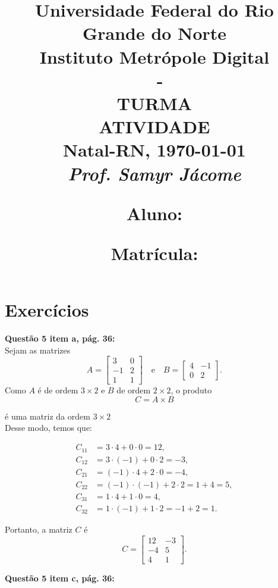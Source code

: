 \documentclass[a4paper,12pt]{article}
\author{}
\date{}
\title{
\vspace{-2cm}
\Large \textbf{Universidade Federal do Rio Grande do Norte}\\ 
Instituto Metrópole Digital \\ 
\coddisciplina $\;$ - \nomedisciplina \\ 
TURMA \codturma \\
\vspace{5mm} \Large\textbf{ATIVIDADE \codatividade} \\
\normalsize Natal-RN, \today\\
\vspace{0.7cm} \large \textit{Prof. Samyr Jácome}\\

\justifying
\vspace{0.5cm} \hspace{-0.82cm}
\begin{minipage}{.6\linewidth}
    \large \textbf{Aluno:} \nomedoaluno
\end{minipage}
\begin{minipage}{.4\linewidth}
    \begin{flushright}
        \large \textbf{Matrícula:} \matricula
    \end{flushright}
\end{minipage}
}
\def\tirarident{\setlength{\parindent}{0cm}} %
\begin{document}
\maketitle

\vspace{-2cm}
\section*{Exercícios}

\tirarident

\textbf{Questão 5 item a, pág. 36:}\\


Sejam as matrizes
\[
A = \begin{bmatrix}
3 & 0 \\
-1 & 2 \\
1 & 1 
\end{bmatrix}
\quad \text{e} \quad
B = \begin{bmatrix}
4 & -1 \\
0 & 2
\end{bmatrix}.
\]
Como \(A\) é de ordem \(3 \times 2\) e \(B\) de ordem \(2 \times 2\), o produto
\[
C = A \times B
\]

é uma matriz da ordem \(3 \times 2\)\\

Desse modo, temos que: 

\[
\begin{aligned}
C_{11} &= 3 \cdot 4 + 0 \cdot 0 = 12,\\[4mm]
C_{12} &= 3 \cdot (-1) + 0 \cdot 2 = -3,\\[4mm]
C_{21} &= (-1) \cdot 4 + 2 \cdot 0 = -4,\\[4mm]
C_{22} &= (-1) \cdot (-1) + 2 \cdot 2 = 1 + 4 = 5,\\[4mm]
C_{31} &= 1 \cdot 4 + 1 \cdot 0 = 4,\\[4mm]
C_{32} &= 1 \cdot (-1) + 1 \cdot 2 = -1 + 2 = 1.
\end{aligned}
\]

Portanto, a matriz \(C\) é
\[
C = \begin{bmatrix}
12 & -3 \\
-4 & 5 \\
4 & 1
\end{bmatrix}.
\]


\textbf{Questão 5 item c, pág. 36:}\\
\end{document}
